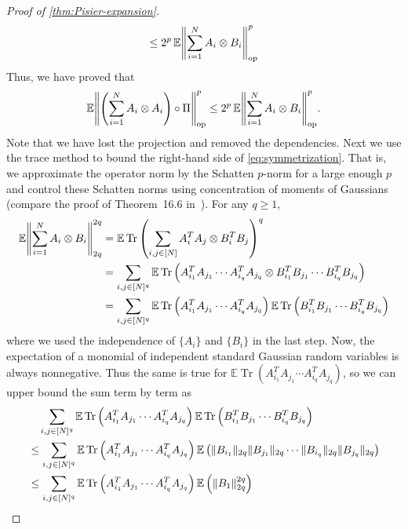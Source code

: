 \documentclass[aos]{imsart}
\theoremstyle{definition}
\numberwithin{equation}{section}
\DeclareMathOperator{\op}{op}
\DeclareMathOperator{\tr}{Tr}
\DeclarePairedDelimiter{\norm}{\lVert}{\rVert}
\newcommand{\ot}{\otimes}
\newcommand{\E}{\mathbb{E}}
\begin{document}
\begin{appendix}
\begin{proof} [Proof of \cref{thm:Pisier-expansion}]
\begin{align*}
\leq 2^{p} \, \E \norm*{\sum_{i=1}^N A_i \otimes B_i}_{\op}^p
\end{align*}
Thus, we have proved that
\begin{align}\label{eq:symmetrization}
  \E \norm*{\left( \sum_{i=1}^N A_i \otimes A_i \right) \circ \Pi}_{\op}^p
\leq 2^{p} \, \E \norm*{\sum_{i=1}^N A_i \otimes B_i}_{\op}^p.
\end{align}
Note that we have lost the projection and removed the dependencies.
Next we use the trace method to bound the right-hand side of \cref{eq:symmetrization}.
That is, we approximate the operator norm by the Schatten $p$-norm for a large enough $p$ and control these Schatten norms using concentration of moments of Gaussians (compare the proof of Theorem~16.6 in~\cite{pisier2012grothendieck}).
For any $q\geq1$,
\begin{align*}
\E \norm*{\sum_{i=1}^N A_i \ot B_i}_{2q}^{2q}
&= \E \tr \left( \sum_{i,j\in[N]} A_i^T A_j \ot B_i^T B_j \right)^q \\
&= \sum_{i, j \in [N]^q} \E \tr \left( A^T_{i_1} A_{j_1} \cdots A^T_{i_q} A_{j_q} \ot B^T_{i_1} B_{j_1} \cdots B^T_{i_q} B_{j_q} \right) \\
&= \sum_{i, j \in [N]^q} \E \tr \left( A^T_{i_1} A_{j_1} \cdots A^T_{i_q} A_{j_q} \right) \E \tr \left( B^T_{i_1} B_{j_1} \cdots B^T_{i_q} B_{j_q} \right)
\end{align*}
where we used the independence of $\{A_i\}$ and $\{B_i\}$ in the last step.
Now, the expectation of a monomial of independent standard Gaussian random variables is always nonnegative.
Thus the same is true for $\E \tr ( A^T_{i_1} A_{j_1} \cdots A^T_{i_q} A_{j_q} )$, so we can upper bound the sum term by term as
\begin{align*}
&\quad \sum_{i, j \in [N]^q} \E \tr \left( A^T_{i_1} A_{j_1} \cdots A^T_{i_q} A_{j_q} \right) \E \tr \left( B^T_{i_1} B_{j_1} \cdots B^T_{i_q} B_{j_q} \right) \\
&\leq \sum_{i, j \in [N]^q} \E \tr \left( A^T_{i_1} A_{j_1} \cdots A^T_{i_q} A_{j_q} \right) \E \left( \norm{ B_{i_1} }_{2q} \norm{B_{j_1}}_{2q} \cdots \norm{ B_{i_q} }_{2q} \norm{B_{j_q}}_{2q} \right) \\
&\leq \sum_{i, j \in [N]^q} \E \tr \left( A^T_{i_1} A_{j_1} \cdots A^T_{i_q} A_{j_q} \right) \E \left( \norm{ B_1 }_{2q}^{2q} \right) \\

\end{align*}
\end{proof}
\end{appendix}
\end{document}
